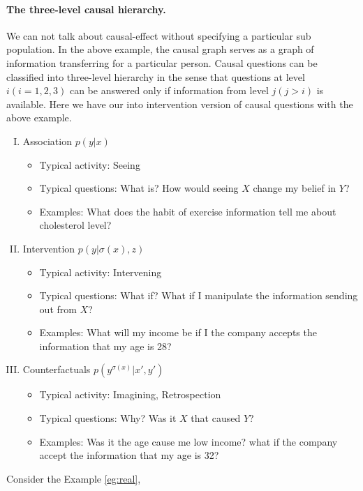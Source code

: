 \paragraph{The three-level causal hierarchy.}  We can not talk about causal-effect without specifying a particular sub population. In the above example, the causal graph serves as a graph of information transferring for a particular person. Causal questions can be classified into three-level hierarchy\cite{Pearl2019seven} in the sense that questions at level $i(i=1, 2,3)$ can be answered only if information from level $j(j>i)$ is available. Here we have our into intervention version of causal questions with the above example.
\begin{enumerate}[I)]
	\setlength{\itemsep}{-1pt}
	\item Association $p(y|x)$
	\begin{itemize}
		\setlength{\itemsep}{0pt}		
		\item Typical activity: Seeing
		\item Typical questions: What is? How would seeing $X$ change my belief in $Y$?
		\item Examples: What does the habit of exercise information tell me about cholesterol level? 
	\end{itemize}
	\item Intervention $p(y|\sigma(x), z)$
	\begin{itemize}
		\setlength{\itemsep}{0pt}		
		\item Typical activity: Intervening
		\item Typical questions: What if?  What if I manipulate the information sending out from $X$?
		\item Examples: What will my income be if I the company accepts the information that my age is 28?
	\end{itemize}
	\item Counterfactuals $p(y^{\sigma(x)}|x', y')$
	\begin{itemize}
		\setlength{\itemsep}{0pt}		
		\item Typical activity: Imagining, Retrospection
		\item Typical questions: Why?  Was it $X$ that caused $Y$? 
		\item Examples: Was it the age cause me low income?  what if the company accept the information that my age is 32? 
	\end{itemize}
\end{enumerate}

Consider the Example \ref{eg:real},

